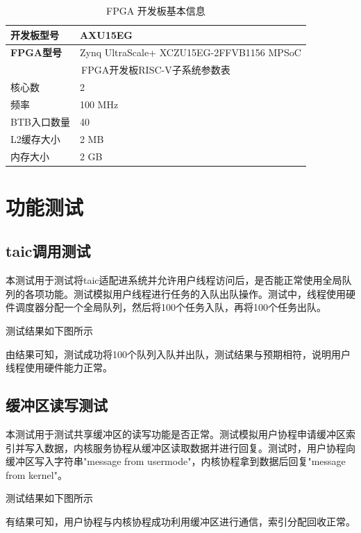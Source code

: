 \begin{table}[htbp]
\centering
\renewcommand{\arraystretch}{1.2}
\begin{tabular}{|l|l|}
\hline
\textbf{开发板型号} & AXU15EG \\
\hline
\textbf{FPGA型号} & Zynq UltraScale+ XCZU15EG-2FFVB1156 MPSoC \\
\hline
\multicolumn{2}{|c|}{FPGA开发板RISC-V子系统参数表} \\
\hline
核心数 & 2 \\
\hline
频率 & 100 MHz \\
\hline
BTB入口数量 & 40 \\
\hline
L2缓存大小 & 2 MB \\
\hline
内存大小 & 2 GB \\
\hline
\end{tabular}
\caption{FPGA 开发板基本信息}
\label{tab:fpga-info}
\end{table}

\section{功能测试}

\subsection{taic调用测试}

本测试用于测试将taic适配进系统并允许用户线程访问后，是否能正常使用全局队列的各项功能。测试模拟用户线程进行任务的入队出队操作。测试中，线程使用硬件调度器分配一个全局队列，然后将100个任务入队，再将100个任务出队。

测试结果如下图所示


由结果可知，测试成功将100个队列入队并出队，测试结果与预期相符，说明用户线程使用硬件能力正常。

\subsection{缓冲区读写测试}

本测试用于测试共享缓冲区的读写功能是否正常。测试模拟用户协程申请缓冲区索引并写入数据，内核服务协程从缓冲区读取数据并进行回复。测试时，用户协程向缓冲区写入字符串"message from usermode"，内核协程拿到数据后回复"message from kernel"。

测试结果如下图所示


有结果可知，用户协程与内核协程成功利用缓冲区进行通信，索引分配回收正常。

